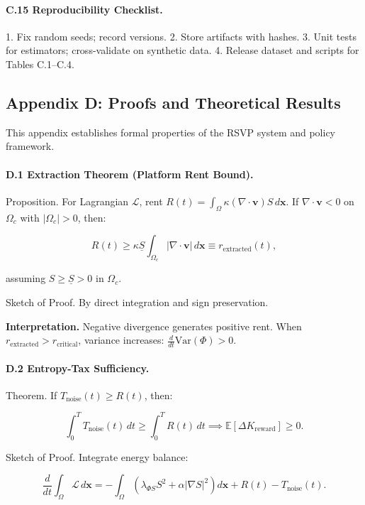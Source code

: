 \documentclass[12pt]{article}
\begin{document}
\paragraph{C.15 Reproducibility Checklist.}

1. Fix random seeds; record versions.
2. Store artifacts with hashes.
3. Unit tests for estimators; cross-validate on synthetic data.
4. Release dataset and scripts for Tables C.1–C.4.

\subsection*{Appendix D: Proofs and Theoretical Results}

This appendix establishes formal properties of the RSVP system and policy framework.

\paragraph{D.1 Extraction Theorem (Platform Rent Bound).}

Proposition. For Lagrangian \(\mathcal{L}\), rent \( R(t) = \int_\Omega \kappa (\nabla \cdot \mathbf{v}) S \, d\mathbf{x} \). If \(\nabla \cdot \mathbf{v} < 0\) on \(\Omega_c\) with \( |\Omega_c| > 0 \), then:

\[
R(t) \geq \kappa \underline{S} \int_{\Omega_c} |\nabla \cdot \mathbf{v}| \, d\mathbf{x} \equiv r_{\text{extracted}}(t),
\]

assuming \( S \geq \underline{S} > 0 \) in \(\Omega_c\).

Sketch of Proof. By direct integration and sign preservation.

\textbf{Interpretation.} Negative divergence generates positive rent. When \( r_{\text{extracted}} > r_{\text{critical}} \), variance increases: \(\frac{d}{dt} \text{Var}(\Phi) > 0\).

\paragraph{D.2 Entropy-Tax Sufficiency.}

Theorem. If \( T_{\text{noise}}(t) \geq R(t) \), then:

\[
\int_0^T T_{\text{noise}}(t) \, dt \geq \int_0^T R(t) \, dt \implies \mathbb{E}[\Delta K_{\text{reward}}] \geq 0.
\]

Sketch of Proof. Integrate energy balance:

\[
\frac{d}{dt} \int_\Omega \mathcal{L} \, d\mathbf{x} = - \int_\Omega (\lambda_{\Phi S} S^2 + \alpha |\nabla S|^2) d\mathbf{x} + R(t) - T_{\text{noise}}(t).
\]
\end{document}
